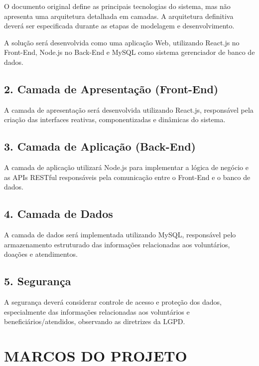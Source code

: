 \documentclass[12pt,a4paper]{article}
\begin{document}
O documento original define as principais tecnologias do sistema, mas
não apresenta uma arquitetura detalhada em camadas. A arquitetura
definitiva deverá ser especificada durante as etapas de modelagem e
desenvolvimento.

A solução será desenvolvida como uma aplicação Web, utilizando React.js
no Front-End, Node.js no Back-End e MySQL como sistema gerenciador de
banco de dados.

\subsection*{2. Camada de Apresentação (Front-End)}

A camada de apresentação será desenvolvida utilizando React.js,
responsável pela criação das interfaces reativas, componentizadas e
dinâmicas do sistema.

\subsection*{3. Camada de Aplicação (Back-End)}

A camada de aplicação utilizará Node.js para implementar a lógica de
negócio e as APIs RESTful responsáveis pela comunicação entre o
Front-End e o banco de dados.

\subsection*{4. Camada de Dados}

A camada de dados será implementada utilizando MySQL, responsável pelo
armazenamento estruturado das informações relacionadas aos voluntários,
doações e atendimentos.

\subsection*{5. Segurança}

A segurança deverá considerar controle de acesso e proteção dos dados,
especialmente das informações relacionadas aos voluntários e
beneficiários/atendidos, observando as diretrizes da LGPD.


\section*{MARCOS DO PROJETO}
\end{document}
